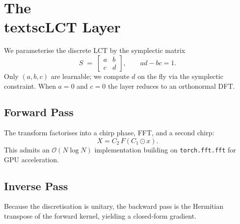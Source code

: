 \section{The \\textsc{LCT} Layer}
\label{sec:method}
We parameterise the discrete LCT by the symplectic matrix
\[ S \;=\;
  \begin{bmatrix} a & b \\ c & d
\end{bmatrix}, \qquad ad - bc = 1. \]
Only \((a,b,c)\) are learnable; we compute $d$ on the fly via the symplectic constraint.  When $a=0$ and $c=0$ the layer reduces to an orthonormal DFT.

\subsection{Forward Pass}
The transform factorises into a chirp phase, FFT, and a second chirp:
\[ X = C_2 \, F \left( C_1 \odot x \right). \]
This admits an $\mathcal{O}(N \log N)$ implementation building on
\verb|torch.fft.fft| for GPU acceleration.

\subsection{Inverse Pass}
Because the discretisation is unitary, the backward pass is the Hermitian transpose of the forward kernel, yielding a closed‐form gradient.
